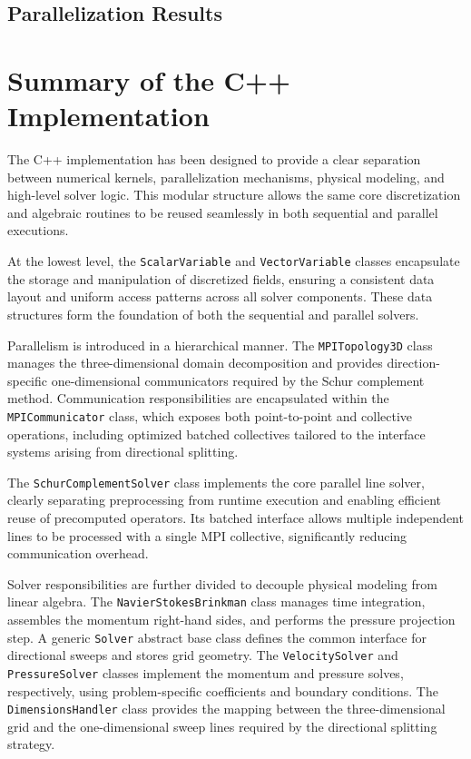 \documentclass[12pt]{article}
\begin{document}
\subsection{Parallelization Results}


\section{Summary of the C++ Implementation}

The C++ implementation has been designed to provide a clear separation between numerical kernels, parallelization mechanisms, physical modeling, and high-level solver logic. This modular structure allows the same core discretization and algebraic routines to be reused seamlessly in both sequential and parallel executions.

At the lowest level, the \texttt{ScalarVariable} and \texttt{VectorVariable} classes encapsulate the storage and manipulation of discretized fields, ensuring a consistent data layout and uniform access patterns across all solver components. These data structures form the foundation of both the sequential and parallel solvers.

Parallelism is introduced in a hierarchical manner. The \texttt{MPITopology3D} class manages the three-dimensional domain decomposition and provides direction-specific one-dimensional communicators required by the Schur complement method. Communication responsibilities are encapsulated within the \texttt{MPICommunicator} class, which exposes both point-to-point and collective operations, including optimized batched collectives tailored to the interface systems arising from directional splitting.

The \texttt{SchurComplementSolver} class implements the core parallel line solver, clearly separating preprocessing from runtime execution and enabling efficient reuse of precomputed operators. Its batched interface allows multiple independent lines to be processed with a single MPI collective, significantly reducing communication overhead.

Solver responsibilities are further divided to decouple physical modeling from linear algebra. The \texttt{NavierStokesBrinkman} class manages time integration, assembles the momentum right-hand sides, and performs the pressure projection step. A generic \texttt{Solver} abstract base class defines the common interface for directional sweeps and stores grid geometry. The \texttt{VelocitySolver} and \texttt{PressureSolver} classes implement the momentum and pressure solves, respectively, using problem-specific coefficients and boundary conditions. The \texttt{DimensionsHandler} class provides the mapping between the three-dimensional grid and the one-dimensional sweep lines required by the directional splitting strategy.
\end{document}
